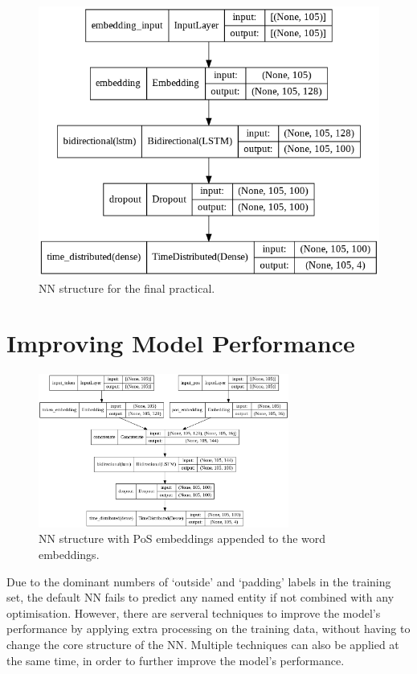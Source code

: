 \documentclass[11pt,a4paper]{article}
\begin{document}
\begin{figure}
    \centering
    \includegraphics[width=\columnwidth]{figs/model.png}
    \caption{NN structure for the final practical.}
    \label{fig:model}
\end{figure}

\section{Improving Model Performance}

\begin{figure}
    \centering
    \includegraphics[width=0.733\textwidth]{figs/model-pos.png}
    \caption{NN structure with PoS embeddings appended to the word embeddings.}
    \label{fig:model-pos}
\end{figure}

Due to the dominant numbers of `outside' and `padding' labels in the training set, the default NN fails to predict any named entity if not combined with any optimisation. However, there are serveral techniques to improve the model's performance by applying extra processing on the training data, without having to change the core structure of the NN. Multiple techniques can also be applied at the same time, in order to further improve the model's performance. 
\end{document}
